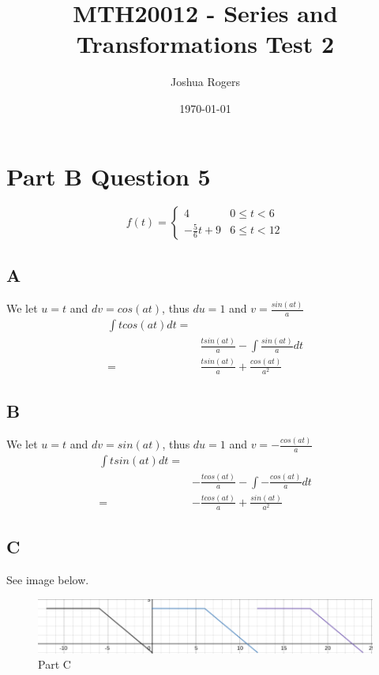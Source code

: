 \documentclass{article}
\title{\vspace{-4cm}MTH20012 - Series and Transformations Test 2}
\author{Joshua Rogers}
\date\today
\begin{document}
\maketitle 

\section*{Part B Question 5}

\[ f(t) = \begin{cases} 
      4 & 0\leq t < 6 \\
      -\frac{5}{6}t+9 & 6\leq t < 12
   \end{cases}
\]

\subsection*{A}

We let $u=t$ and $dv=cos(at)$, thus $du = 1$ and $v = \frac{sin(at)}{a}$
\begin{align*}
\int t cos(at) dt =&\\
&\frac{tsin(at)}{a} - \int \frac{sin(at)}{a} dt\\
= &\frac{tsin(at)}{a} + \frac{cos(at)}{a^2}
\end{align*}

\subsection*{B}

We let $u=t$ and $dv=sin(at)$, thus $du = 1$ and $v = -\frac{cos(at)}{a}$
\begin{align*}
\int t sin(at) dt =&\\
&-\frac{tcos(at)}{a} - \int -\frac{cos(at)}{a} dt\\
= &-\frac{tcos(at)}{a} + \frac{sin(at)}{a^2}
\end{align*}

\subsection*{C}
See image below.
\begin{figure}
\centering
\includegraphics[width=1.0\textwidth]{./static/graph3.png}
\caption{Part C}
\end{figure}
\end{document}
